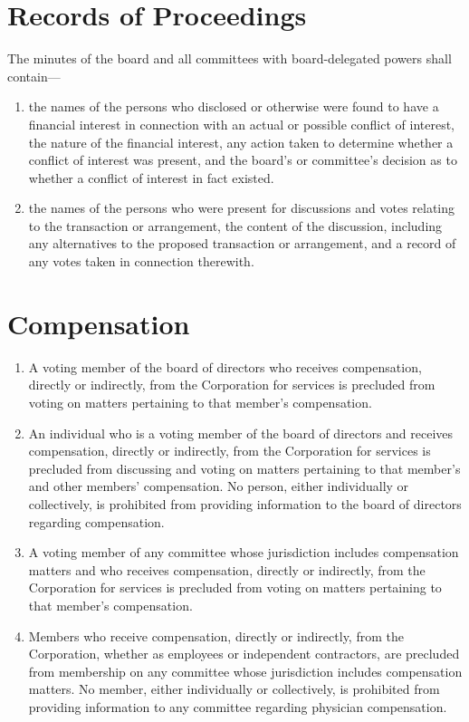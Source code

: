 \documentclass[12pt]{article}
\begin{document}
\section{Records of Proceedings}

The minutes of the board and all committees with board-delegated powers shall contain---

\begin{enumerate}

\item the names of the persons who disclosed or otherwise were found to have a financial interest in connection with an actual or possible conflict of interest, the nature of the financial interest, any action taken to determine whether a conflict of interest was present, and the board's or committee's decision as to whether a conflict of interest in fact existed. 

\item the names of the persons who were present for discussions and votes relating to the transaction or arrangement, the content of the discussion, including any alternatives to the proposed transaction or arrangement, and a record of any votes taken in connection therewith. 
\end{enumerate}

\section{Compensation}

\begin{enumerate}
\item A voting member of the board of directors who receives compensation, directly or indirectly, from the Corporation for services is precluded from voting on matters pertaining to that member's compensation. 

\item An individual who is a voting member of the board of directors and receives compensation, directly or indirectly, from the Corporation for services is precluded from discussing and voting on matters pertaining to that member's and other members' compensation. No person, either individually or collectively, is prohibited from providing information to the board of directors regarding compensation. 

\item A voting member of any committee whose jurisdiction includes compensation matters and who receives compensation, directly or indirectly, from the Corporation for services is precluded from voting on matters pertaining to that member's compensation. 

\item Members who receive compensation, directly or indirectly, from the Corporation, whether as employees or independent contractors, are precluded from membership on any committee whose jurisdiction includes compensation matters. No member, either individually or collectively, is prohibited from providing information to any committee regarding physician compensation. 
\end{enumerate}
\end{document}
